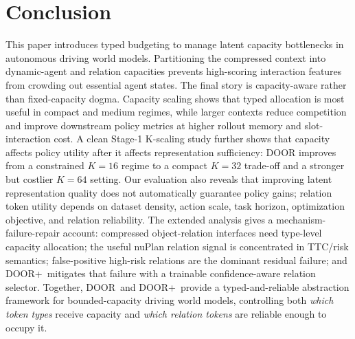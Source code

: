 \documentclass[10pt,journal,compsoc]{IEEEtran}
\newcommand{\method}{\textsc{DOOR}}
\newcommand{\doorplus}{\textsc{DOOR+}}
\begin{document}


\section{Conclusion}
This paper introduces typed budgeting to manage latent capacity bottlenecks in autonomous driving world models. Partitioning the compressed context into dynamic-agent and relation capacities prevents high-scoring interaction features from crowding out essential agent states. The final story is capacity-aware rather than fixed-capacity dogma. Capacity scaling shows that typed allocation is most useful in compact and medium regimes, while larger contexts reduce competition and improve downstream policy metrics at higher rollout memory and slot-interaction cost. A clean Stage-1 K-scaling study further shows that capacity affects policy utility after it affects representation sufficiency: DOOR improves from a constrained $K=16$ regime to a compact $K=32$ trade-off and a stronger but costlier $K=64$ setting. Our evaluation also reveals that improving latent representation quality does not automatically guarantee policy gains; relation token utility depends on dataset density, action scale, task horizon, optimization objective, and relation reliability. The extended analysis gives a mechanism-failure-repair account: compressed object-relation interfaces need type-level capacity allocation; the useful nuPlan relation signal is concentrated in TTC/risk semantics; false-positive high-risk relations are the dominant residual failure; and \doorplus\ mitigates that failure with a trainable confidence-aware relation selector. Together, \method\ and \doorplus\ provide a typed-and-reliable abstraction framework for bounded-capacity driving world models, controlling both \emph{which token types} receive capacity and \emph{which relation tokens} are reliable enough to occupy it.
\end{document}
